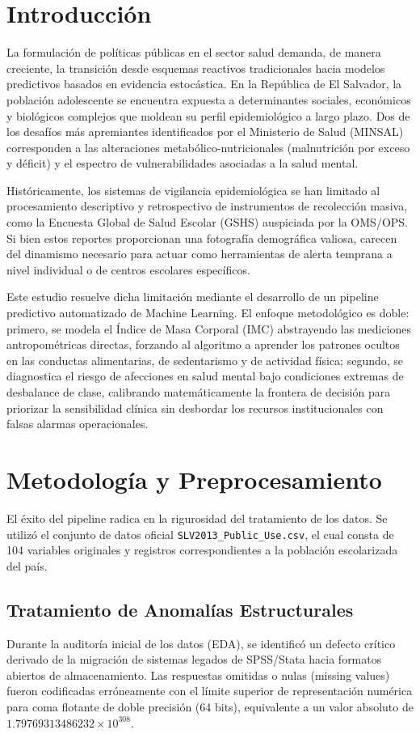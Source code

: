 \documentclass[10pt,journal,compsoc]{IEEEtran}
\begin{document}
\section{Introducción}
La formulación de políticas públicas en el sector salud demanda, de manera creciente, la transición desde esquemas reactivos tradicionales hacia modelos predictivos basados en evidencia estocástica. En la República de El Salvador, la población adolescente se encuentra expuesta a determinantes sociales, económicos y biológicos complejos que moldean su perfil epidemiológico a largo plazo. Dos de los desafíos más apremiantes identificados por el Ministerio de Salud (MINSAL) corresponden a las alteraciones metabólico-nutricionales (malnutrición por exceso y déficit) y el espectro de vulnerabilidades asociadas a la salud mental.

Históricamente, los sistemas de vigilancia epidemiológica se han limitado al procesamiento descriptivo y retrospectivo de instrumentos de recolección masiva, como la Encuesta Global de Salud Escolar (GSHS) auspiciada por la OMS/OPS. Si bien estos reportes proporcionan una fotografía demográfica valiosa, carecen del dinamismo necesario para actuar como herramientas de alerta temprana a nivel individual o de centros escolares específicos.

Este estudio resuelve dicha limitación mediante el desarrollo de un pipeline predictivo automatizado de Machine Learning. El enfoque metodológico es doble: primero, se modela el Índice de Masa Corporal (IMC) abstrayendo las mediciones antropométricas directas, forzando al algoritmo a aprender los patrones ocultos en las conductas alimentarias, de sedentarismo y de actividad física; segundo, se diagnostica el riesgo de afecciones en salud mental bajo condiciones extremas de desbalance de clase, calibrando matemáticamente la frontera de decisión para priorizar la sensibilidad clínica sin desbordar los recursos institucionales con falsas alarmas operacionales.

\section{Metodología y Preprocesamiento}
El éxito del pipeline radica en la rigurosidad del tratamiento de los datos. Se utilizó el conjunto de datos oficial \texttt{SLV2013\_Public\_Use.csv}, el cual consta de 104 variables originales y registros correspondientes a la población escolarizada del país.

\subsection{Tratamiento de Anomalías Estructurales}
Durante la auditoría inicial de los datos (EDA), se identificó un defecto crítico derivado de la migración de sistemas legados de SPSS/Stata hacia formatos abiertos de almacenamiento. Las respuestas omitidas o nulas (missing values) fueron codificadas erróneamente con el límite superior de representación numérica para coma flotante de doble precisión (64 bits), equivalente a un valor absoluto de $1.79769313486232 \times 10^{308}$.
\end{document}
